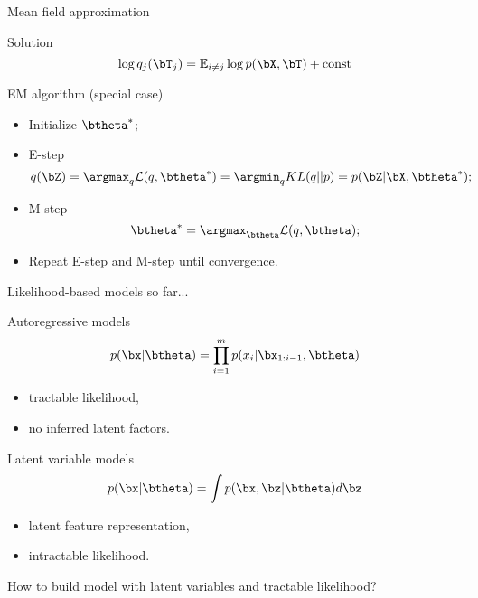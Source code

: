 \begin{frame}{Mean field approximation}
    \begin{block}{Solution}
    \[
        \log q_j(\bT_j) = \mathbb{E}_{i \neq j} \log p(\bX, \bT) + \text{const}
    \]
    \end{block}

	\begin{block}{EM algorithm (special case)}
	\begin{itemize}
		\item Initialize $\btheta^*$;
		\item E-step
		\[
			q(\bZ) = \argmax_q \mathcal{L} (q, \btheta^*) = \argmin_q KL(q || p) =
			 p(\bZ| \bX, \btheta^*);
		\]
		\item M-step
		\[
			\btheta^* = \argmax_{\btheta} \mathcal{L} (q, \btheta);
		\]
		\item Repeat E-step and M-step until convergence.
	\end{itemize}
	\end{block}
\end{frame}
\begin{frame}{Likelihood-based models so far...}
	\begin{minipage}[t]{0.5\columnwidth}
		\begin{block}{Autoregressive models}
			\vspace{-0.5cm}
			\[
			p(\bx|\btheta) = \prod_{i=1}^m p(x_i | \bx_{1:i - 1}, \btheta)
			\]
			\vspace{-0.2cm}
			\begin{itemize}
				\item tractable likelihood, 
				\item no inferred latent factors.
			\end{itemize}
		\end{block}
	\end{minipage}%
	\begin{minipage}[t]{0.5\columnwidth}
		\begin{block}{Latent variable models}
			\[
			p(\bx| \btheta) = \int p(\bx, \bz | \btheta) d \bz
			\]
			\begin{itemize}
				\item latent feature representation, 
				\item intractable likelihood.
			\end{itemize}
		\end{block}
	\end{minipage}
	
	\vspace{1cm } 
	How to build model with latent variables and tractable likelihood?
\end{frame}

